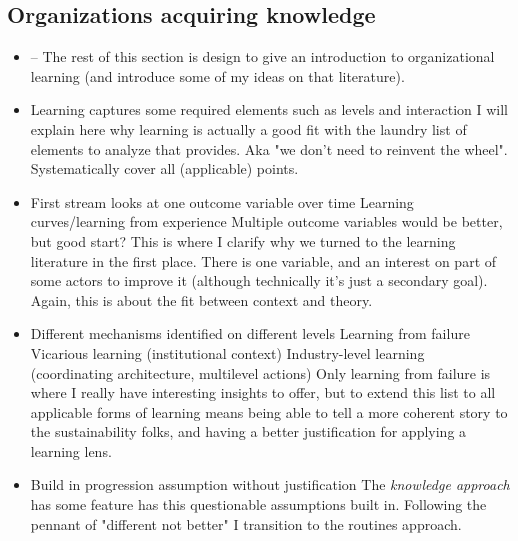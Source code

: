 	\subsection{Organizations acquiring knowledge}
	\begin{paracol}{2}
	\begin{itemize}
		\item -- 
		\switchcolumn The rest of this section is design to give an introduction to organizational learning (and introduce some of my ideas on that literature).
		\switchcolumn*
		
		\item Learning captures some required elements such as levels and interaction
		\switchcolumn I will explain here why learning is actually a good fit with the laundry list of elements to analyze that \citet{George2016} provides. Aka "we don't need to reinvent the wheel". Systematically cover all (applicable) points.
		\switchcolumn*
		
		\item First stream looks at one outcome variable over time
			\subitem Learning curves/learning from experience
			\subitem Multiple outcome variables would be better, but good start?
		\switchcolumn This is where I clarify why we turned to the learning literature in the first place. There is one variable, and an interest on part of some actors to improve it (although technically it's just a secondary goal). Again, this is about the fit between context and theory.
		\switchcolumn*
			
		\item Different mechanisms identified on different levels
			\subitem Learning from failure
			\subitem Vicarious learning (institutional context)
			\subitem Industry-level learning (coordinating architecture, multilevel actions)
		\switchcolumn Only learning from failure is where I really have interesting insights to offer, but to extend this list to all applicable forms of learning means being able to tell a more coherent story to the sustainability folks, and having a better justification for applying a learning lens.
		\switchcolumn*			

		\item Build in progression assumption without justification
		\switchcolumn The \textit{knowledge approach} has some feature has this questionable assumptions built in. Following the pennant of "different not better" I transition to the routines approach.
		\switchcolumn*
	\end{itemize}
	\end{paracol}


